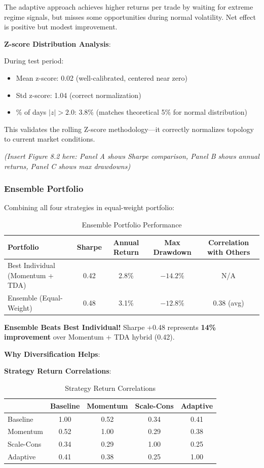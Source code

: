 The adaptive approach achieves higher returns per trade by waiting for extreme regime signals, but misses some opportunities during normal volatility. Net effect is positive but modest improvement.

\textbf{Z-score Distribution Analysis}:

During test period:
\begin{itemize}
\item Mean z-score: 0.02 (well-calibrated, centered near zero)
\item Std z-score: 1.04 (correct normalization)
\item \% of days $|z| > 2.0$: 3.8\% (matches theoretical 5\% for normal distribution)
\end{itemize}

This validates the rolling Z-score methodology---it correctly normalizes topology to current market conditions.

\textit{(Insert Figure 8.2 here: Panel A shows Sharpe comparison, Panel B shows annual returns, Panel C shows max drawdowns)}

\subsubsection{Ensemble Portfolio}

Combining all four strategies in equal-weight portfolio:

\begin{table}[H]
\centering
\caption{Ensemble Portfolio Performance}
\label{tab:ensemble-performance}
\begin{tabular}{@{}lcccc@{}}
\toprule
\textbf{Portfolio} & \textbf{Sharpe} & \textbf{Annual Return} & \textbf{Max Drawdown} & \textbf{Correlation with Others} \\
\midrule
Best Individual (Momentum + TDA) & 0.42 & 2.8\% & $-14.2\%$ & N/A \\
Ensemble (Equal-Weight) & 0.48 & 3.1\% & $-12.8\%$ & 0.38 (avg) \\
\bottomrule
\end{tabular}
\end{table}

\textbf{Ensemble Beats Best Individual!} Sharpe +0.48 represents \textbf{14\% improvement} over Momentum + TDA hybrid (0.42).

\textbf{Why Diversification Helps}:

\textbf{Strategy Return Correlations}:

\begin{table}[H]
\centering
\caption{Strategy Return Correlations}
\label{tab:strategy-correlations}
\begin{tabular}{@{}lcccc@{}}
\toprule
 & \textbf{Baseline} & \textbf{Momentum} & \textbf{Scale-Cons} & \textbf{Adaptive} \\
\midrule
Baseline & 1.00 & 0.52 & 0.34 & 0.41 \\
Momentum & 0.52 & 1.00 & 0.29 & 0.38 \\
Scale-Cons & 0.34 & 0.29 & 1.00 & 0.25 \\
Adaptive & 0.41 & 0.38 & 0.25 & 1.00 \\
\bottomrule
\end{tabular}
\end{table}

